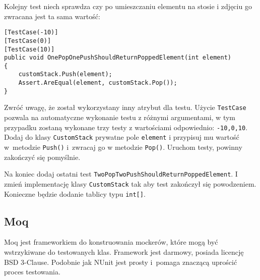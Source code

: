 Kolejny test niech sprawdza czy po umieszczaniu elementu na stosie i zdjęciu go zwracana jest ta sama wartość:
\begin{lstlisting}
[TestCase(-10)]
[TestCase(0)]
[TestCase(10)]
public void OnePopOnePushShouldReturnPoppedElement(int element)
{
	customStack.Push(element);
	Assert.AreEqual(element, customStack.Pop());
}
\end{lstlisting}
Zwróć uwagę, że został wykorzystany inny atrybut dla testu. Użycie \texttt{TestCase} pozwala na automatyczne wykonanie testu z różnymi argumentami, w tym przypadku zostaną wykonane trzy testy z wartościami odpowiednio: \texttt{-10,0,10}. Dodaj do klasy \texttt{CustomStack} prywatne pole \texttt{element} i przypisuj mu wartość w~metodzie \texttt{Push()} i~zwracaj go w metodzie \texttt{Pop()}. Uruchom testy, powinny zakończyć się pomyślnie.

Na koniec dodaj ostatni test \texttt{TwoPopTwoPushShouldReturnPoppedElement}. I zmień implementację klasy \texttt{CustomStack} tak aby test zakończył się powodzeniem. Konieczne będzie dodanie tablicy typu \texttt{int[]}.


\subsection{Moq}
Moq jest frameworkiem do konstruowania mockerów, które mogą być wstrzykiwane do testowanych klas. Framework jest darmowy, posiada licencję BSD 3-Clause. Podobnie jak NUnit jest prosty i~pomaga znaczącą uprościć proces testowania.


